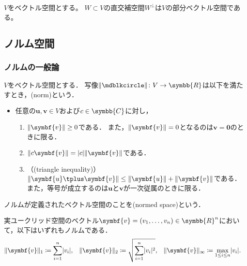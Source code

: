 \documentclass[../sotsu.tex]{subfiles}
\begin{document}
\begin{corollary}
    $V$をベクトル空間とする。
    $W \subset V$の直交補空間$W^\perp$は$V$の部分ベクトル空間である。
\end{corollary}





\subsection{ノルム空間}
\label{sec:norm-space}

\subsubsection{ノルムの一般論}

\begin{definition}[ノルム]
    \label{dfn:norm}
    $V$をベクトル空間とする．
    写像$\norm{\bigdot} \colon V \to \symbb{R}$は以下を満たすとき，(norm)という．
    \begin{itemize}
        \item 任意の$\symbf{u}, \symbf{v} \in V$および$c \in \symbb{C}$に対し，
        \begin{enumerate}
            \item \label{norm:positivity}$\norm{\symbf{v}} \geq 0$である．
                また，$\norm{\symbf{v}} = 0$となるのは$\symbf{v} = \symbf{0}$のときに限る．
            \item \label{norm:absolute-homogeneity} $\norm{c\symbf{v}} = \abs{c} \norm{\symbf{v}}$である．
            \item \label{norm:triangle-inequality} （(triangle inequality)）
                $\norm{\symbf{u} \tplus \symbf{v}} \leq \norm{\symbf{u}} + \norm{\symbf{v}}$である．
                また，等号が成立するのは$\symbf{u}$と$\symbf{v}$が一次従属のときに限る．
        \end{enumerate}
    \end{itemize}
    ノルムが定義されたベクトル空間のことを(normed space)という．
\end{definition}

\begin{example}
    実ユークリッド空間のベクトル$\symbf{v} = (v_1, \dots, v_n) \in \symbb{R}^n$において，以下はいずれもノルムである．
    \begin{align}
        \norm{\symbf{v}}_1      &\coloneq        \sum_{i=1}^{n}  \abs{v_i},      &
        \norm{\symbf{v}}_2      &\coloneq \sqrt{ \sum_{i=1}^{n}  \abs{v_i}^2 },  &
        \norm{\symbf{v}}_\infty &\coloneq \max_{1 \leq i \leq n} \abs{v_i}.      &
    \end{align}
\end{example}
\end{document}
